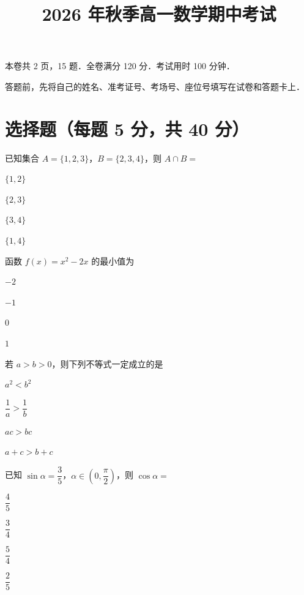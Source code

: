 \documentclass{exam-zh}
\title{2026 年秋季高一数学期中考试}
\begin{document}
\maketitle

\begin{notice}
\item 本卷共 2 页，15 题．全卷满分 120 分．考试用时 100 分钟．
\item 答题前，先将自己的姓名、准考证号、考场号、座位号填写在试卷和答题卡上．
\end{notice}

\section{选择题（每题 5 分，共 40 分）}
\begin{question}
已知集合 $A=\{1,2,3\}$，$B=\{2,3,4\}$，则 $A\cap B=$ \paren
\begin{choices}
\item $\{1,2\}$
\item $\{2,3\}$
\item $\{3,4\}$
\item $\{1,4\}$
\end{choices}
\end{question}
\begin{question}
函数 $f(x)=x^2-2x$ 的最小值为 \paren
\begin{choices}
\item $-2$
\item $-1$
\item $0$
\item $1$
\end{choices}
\end{question}
\begin{question}
若 $a>b>0$，则下列不等式一定成立的是 \paren
\begin{choices}
\item $a^2<b^2$
\item $\dfrac{1}{a}>\dfrac{1}{b}$
\item $ac>bc$
\item $a+c>b+c$
\end{choices}
\end{question}
\begin{question}
已知 $\sin\alpha=\dfrac{3}{5}$，$\alpha\in\left(0,\dfrac{\pi}{2}\right)$，则 $\cos\alpha=$ \paren
\begin{choices}
\item $\dfrac{4}{5}$
\item $\dfrac{3}{4}$
\item $\dfrac{5}{4}$
\item $\dfrac{2}{5}$
\end{choices}
\end{question}
\end{document}
